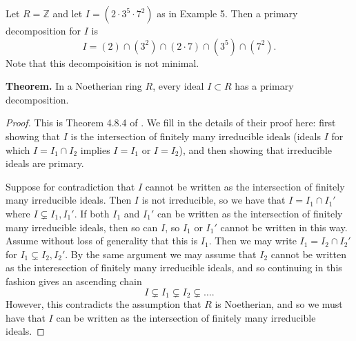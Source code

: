 \documentclass[12pt]{article}
\newenvironment{example}[2][Example]{\begin{trivlist}
\item[\hskip \labelsep {\bfseries #1}\hskip \labelsep {\bfseries #2.}]}{\end{trivlist}}
\newcommand{\Z}{\mathbb{Z}}
\begin{document}
\begin{example}{7}
	Let $R = \Z$ and let $I = (2 \cdot 3^5 \cdot 7^2)$ as in Example 5. Then a primary decomposition for $I$ is \[ I = (2) \cap (3^2) \cap (2 \cdot 7) \cap (3^5) \cap (7^2). \] Note that this decompoisition is not minimal. 
\end{example}


\noindent \textbf{Theorem.} In a Noetherian ring $R$, every ideal $I \subset R$ has a primary decomposition. 

\begin{proof}
	This is Theorem 4.8.4 of \cite{cox2013ideals}. We fill in the details of their proof here: first showing that $I$ is the intersection of finitely many irreducible ideals (ideals $I$ for which $I = I_1 \cap I_2$ implies $I = I_1$ or $I = I_2$), and then showing that irreducible ideals are primary. 

	Suppose for contradiction that $I$ cannot be written as the intersection of finitely many irreducible ideals. Then $I$ is not irreducible, so we have that $I = I_1 \cap I_1'$ where $I \subsetneq I_1, I_1'$. If both $I_1$ and $I_1'$ can be written as the intersection of finitely many irreducible ideals, then so can $I$, so $I_1$ or $I_1'$ cannot be written in this way. Assume without loss of generality that this is $I_1$. Then we may write $I_1 = I_2 \cap I_2'$ for $I_1 \subsetneq I_2, I_2'$. By the same argument we may assume that $I_2$ cannot be written as the interesection of finitely many irreducible ideals, and so continuing in this fashion gives an ascending chain \[ I \subsetneq I_1 \subsetneq I_2 \subsetneq \dots. \] However, this contradicts the assumption that $R$ is Noetherian, and so we must have that $I$ can be written as the intersection of finitely many irreducible ideals. 


\end{proof}
\end{document}
